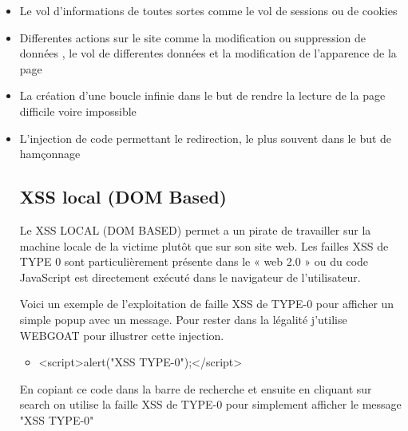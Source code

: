 \begin{itemize}
\item Le vol d'informations de toutes sortes comme le vol de sessions ou de cookies
\item Differentes actions sur le site comme la modification ou suppression de données , le vol de differentes données et la modification de l'apparence de la page
\item La création d'une boucle infinie dans le but de rendre la lecture de la page difficile voire impossible
\item L'injection de code permettant le redirection, le plus souvent dans le but de hamçonnage

\bigskip

\subsection{XSS local (DOM Based)}\label{vulnerabilites:web:xss:dom}

Le XSS LOCAL (DOM BASED) permet a un pirate de travailler sur la machine locale de la victime plutôt que sur son site web. Les failles XSS de TYPE 0 sont particulièrement présente dans le « web 2.0 » ou du code JavaScript est directement exécuté dans le navigateur de l'utilisateur.

\begin{flushleft}
Voici un exemple de l'exploitation de faille XSS de TYPE-0 pour afficher un simple popup avec un message. Pour rester dans la légalité j'utilise WEBGOAT pour illustrer cette injection.
\end{flushleft}

\bigskip

\begin{itemize}
\item <script>alert("XSS TYPE-0");</script>
\end{itemize}

\bigskip

\begin{flushleft}
En copiant ce code dans la barre de recherche et ensuite en cliquant sur search on utilise la faille XSS de TYPE-0 pour simplement afficher le message "XSS TYPE-0"
\end{flushleft}




\end{itemize}
